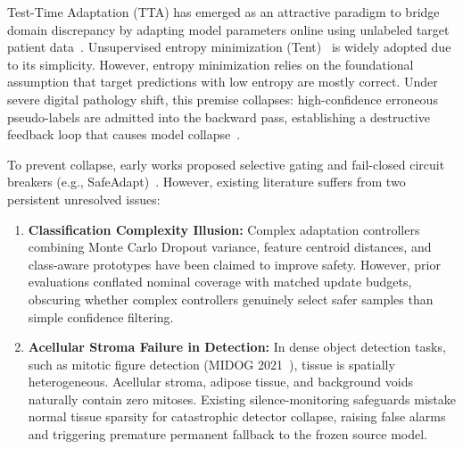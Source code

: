 \documentclass[conference]{IEEEtran}
\begin{document}
Test-Time Adaptation (TTA) has emerged as an attractive paradigm to bridge domain discrepancy by adapting model parameters online using unlabeled target patient data~\cite{wang2021tent,liang2023comprehensive}. Unsupervised entropy minimization (Tent)~\cite{wang2021tent} is widely adopted due to its simplicity. However, entropy minimization relies on the foundational assumption that target predictions with low entropy are mostly correct. Under severe digital pathology shift, this premise collapses: high-confidence erroneous pseudo-labels are admitted into the backward pass, establishing a destructive feedback loop that causes model collapse~\cite{histopathc2026}.

To prevent collapse, early works proposed selective gating and fail-closed circuit breakers (e.g., SafeAdapt)~\cite{niu2022eata,niu2023sar}. However, existing literature suffers from two persistent unresolved issues:
\begin{enumerate}
    \item \textbf{Classification Complexity Illusion:} Complex adaptation controllers combining Monte Carlo Dropout variance, feature centroid distances, and class-aware prototypes have been claimed to improve safety. However, prior evaluations conflated nominal coverage with matched update budgets, obscuring whether complex controllers genuinely select safer samples than simple confidence filtering.
    \item \textbf{Acellular Stroma Failure in Detection:} In dense object detection tasks, such as mitotic figure detection (MIDOG 2021~\cite{aubreville2023mitosis}), tissue is spatially heterogeneous. Acellular stroma, adipose tissue, and background voids naturally contain zero mitoses. Existing silence-monitoring safeguards mistake normal tissue sparsity for catastrophic detector collapse, raising false alarms and triggering premature permanent fallback to the frozen source model.
\end{enumerate}
\end{document}
